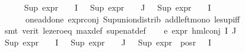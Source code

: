 \begin{isabellebody}
\ \ \ \ \isamarkupfalse%
\ {\isacartoucheopen}Sup\ {\isacharparenleft}{\kern0pt}{\isacharparenleft}{\kern0pt}expr{\isacharunderscore}{\kern0pt}{}\ {\isasymcirc}\ {\isasymPhi}{\isacharparenright}{\kern0pt}\ {\isacharbackquote}{\kern0pt}\ I{\isacharparenright}{\kern0pt}\ {\isasymle}\ {}{\isacartoucheclose}\ {\isacartoucheopen}Sup\ {\isacharparenleft}{\kern0pt}{\isacharparenleft}{\kern0pt}expr{\isacharunderscore}{\kern0pt}{}\ {\isasymcirc}\ {\isasymPhi}{\isacharparenright}{\kern0pt}\ {\isacharbackquote}{\kern0pt}\ J{\isacharparenright}{\kern0pt}\ {\isasymle}\ {}{\isacartoucheclose}\ {\isacartoucheopen}Sup\ {\isacharparenleft}{\kern0pt}{\isacharparenleft}{\kern0pt}expr{\isacharunderscore}{\kern0pt}{}\ {\isasymcirc}\ {\isasymPhi}{\isacharparenright}{\kern0pt}\ {\isacharbackquote}{\kern0pt}\ I{\isacharparenright}{\kern0pt}\ {\isasymle}\ {}{\isacartoucheclose}\ \isanewline
\ \ \ \ \ \ one{\isacharunderscore}{\kern0pt}add{\isacharunderscore}{\kern0pt}one\ expr{\isacharunderscore}{\kern0pt}{}{\isacharunderscore}{\kern0pt}conj\ Sup{\isacharunderscore}{\kern0pt}union{\isacharunderscore}{\kern0pt}distrib\ add{\isacharunderscore}{\kern0pt}left{\isacharunderscore}{\kern0pt}mono\ le{\isacharunderscore}{\kern0pt}sup{\isacharunderscore}{\kern0pt}iff\isanewline
\ \ \ \ \isamarkupfalse%
\ {\isacharparenleft}{\kern0pt}smt\ {\isacharparenleft}{\kern0pt}verit{\isacharparenright}{\kern0pt}\ le{\isacharunderscore}{\kern0pt}zero{\isacharunderscore}{\kern0pt}eq\ max{\isacharunderscore}{\kern0pt}def\ sup{\isacharunderscore}{\kern0pt}enat{\isacharunderscore}{\kern0pt}def{\isacharparenright}{\kern0pt}\isanewline
\ \ \isamarkupfalse%
\ e{}{\isacharcolon}{\kern0pt}\ {\isachardoublequoteopen}expr{\isacharunderscore}{\kern0pt}{}\ {\isacharparenleft}{\kern0pt}hml{\isacharunderscore}{\kern0pt}conj\ I\ J\ {\isasymPhi}{\isacharparenright}{\kern0pt}\ {\isasymle}\ {}{\isachardoublequoteclose}\ \isanewline
\ \ \ \ \isamarkupfalse%
\ {\isacartoucheopen}Sup\ {\isacharparenleft}{\kern0pt}{\isacharparenleft}{\kern0pt}expr{\isacharunderscore}{\kern0pt}{}\ {\isasymcirc}\ {\isasymPhi}{\isacharparenright}{\kern0pt}\ {\isacharbackquote}{\kern0pt}\ I{\isacharparenright}{\kern0pt}\ {\isasymle}\ {}{\isacartoucheclose}\ {\isacartoucheopen}Sup\ {\isacharparenleft}{\kern0pt}{\isacharparenleft}{\kern0pt}expr{\isacharunderscore}{\kern0pt}{}\ {\isasymcirc}\ {\isasymPhi}{\isacharparenright}{\kern0pt}\ {\isacharbackquote}{\kern0pt}\ J{\isacharparenright}{\kern0pt}\ {\isasymle}\ {}{\isacartoucheclose}\ {\isacartoucheopen}Sup\ {\isacharparenleft}{\kern0pt}expr{\isacharunderscore}{\kern0pt}{}\ {\isacharbackquote}{\kern0pt}\ {\isacharparenleft}{\kern0pt}pos{\isacharunderscore}{\kern0pt}r\ {\isacharparenleft}{\kern0pt}{\isasymPhi}\ {\isacharbackquote}{\kern0pt}\ I{\isacharparenright}{\kern0pt}{\isacharparenright}{\kern0pt}{\isacharparenright}{\kern0pt}\ {\isasymle}\ {}{\isacartoucheclose}\isanewline

\end{isabellebody}
